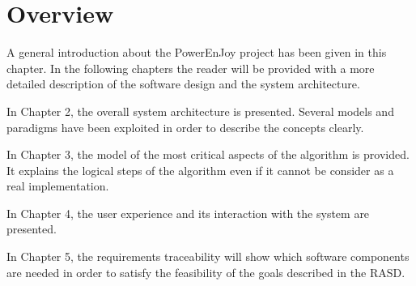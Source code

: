 \section{Overview}

A general introduction about the PowerEnJoy project has been given in this chapter. In the following chapters the reader will be provided with a more detailed description of the software design and the system architecture.

In Chapter 2, the overall system architecture is presented. Several models and paradigms have been exploited in order to describe the concepts clearly.

In Chapter 3, the model of the most critical aspects of the algorithm is provided. It explains the logical steps of the algorithm even if it cannot be consider as a real implementation.

In Chapter 4, the user experience and its interaction with the system are presented.

In Chapter 5, the requirements traceability will show which software components are needed in order to satisfy the feasibility of the goals described in the RASD.
